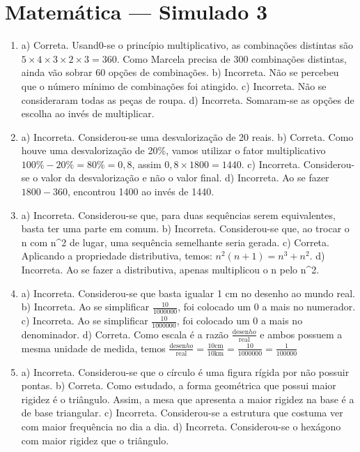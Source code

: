 \section*{Matemática — Simulado 3}

\begin{enumerate}
\item a) Correta. Usand0-se o princípio multiplicativo, as combinações
distintas são $5 \times 4 \times 3 \times 2 \times 3 = 360$. Como Marcela precisa de 300 combinações distintas, ainda vão sobrar 60 opções de combinações.
b) Incorreta. Não se percebeu que o número mínimo de combinações foi atingido.
c) Incorreta. Não se consideraram todas as peças de roupa.
d) Incorreta. Somaram-se as opções de escolha ao invés de multiplicar.


\item a) Incorreta. Considerou-se uma desvalorização de 20 reais.
b) Correta. Como houve uma desvalorização de 20\%, vamos utilizar
o fator multiplicativo $100\% - 20\% = 80\% = 0,8$, assim $0,8 \times 1800 = 1440$.
c) Incorreta. Considerou-se o valor da desvalorização e não o valor final.
d) Incorreta. Ao se fazer $1800 - 360$, encontrou 1400 ao invés de 1440.


\item a) Incorreta. Considerou-se que, para duas sequências serem equivalentes, basta ter uma parte em comum.
b) Incorreta. Considerou-se que, ao trocar o n com n^2 de lugar, uma sequência semelhante seria gerada.
c) Correta. Aplicando a propriedade distributiva, temos:
$n^{2}\left( n + 1 \right) = n^{3} + n^{2}$.
d) Incorreta. Ao se fazer a distributiva, apenas multiplicou o n pelo n^2.

\item a) Incorreta. Considerou-se que basta igualar 1 cm no desenho ao mundo real.
b) Incorreta. Ao se simplificar $\frac{10}{1000000}$, foi colocado um 0 a mais no numerador.
c) Incorreta. Ao se simplificar $\frac{10}{1000000}$, foi colocado um 0 a mais no denominador.
d) Correta. Como escala é a razão
$\frac{\text{desen}ho}{\text{real}}$ e ambos possuem a mesma unidade
de medida, temos $\frac{\text{desen}ho}{\text{real}} = \frac{10\text{cm}}{10\text{km}} = \frac{10}{1000000} = \frac{1}{100000}$


\item a) Incorreta. Considerou-se que o círculo é uma figura rígida por não possuir pontas.
b) Correta. Como estudado, a forma geométrica que possui maior rigidez é o triângulo. Assim, a mesa que apresenta a maior rigidez na base é a de base triangular.
c) Incorreta. Considerou-se a estrutura que costuma ver com maior frequência no dia a dia.
d) Incorreta. Considerou-se o hexágono com maior rigidez que o triângulo.


\end{enumerate}
